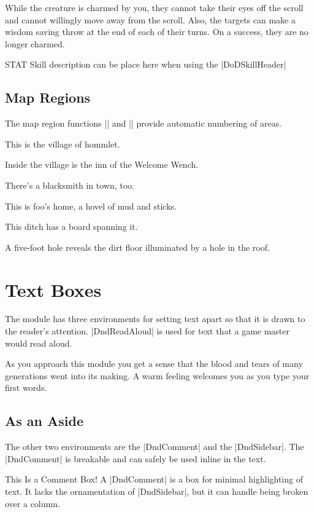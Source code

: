 \documentclass[letterpaper,twocolumn,openany,nodeprecatedcode]{dndbook}
\begin{document}
While the creature is charmed by you, they cannot take their eyes off the scroll and cannot willingly move away from the scroll. Also, the targets can make a wisdom saving throw at the end of each of their turns. On a success, they are no longer charmed.

 {STAT}
Skill description can be place here when using the |DoDSkillHeader|

\section{Map Regions}
The map region functions |\DndArea| and |\DndSubArea| provide automatic numbering of areas.

This is the village of hommlet.

Inside the village is the inn of the Welcome Wench.

There's a blacksmith in town, too.

This is foo's home, a hovel of mud and sticks.

This ditch has a board spanning it.

A five-foot hole reveals the dirt floor illuminated by a hole in the roof.

\chapter{Text Boxes}

The module has three environments for setting text apart so that it is drawn to the reader's attention. |DndReadAloud| is used for text that a game master would read aloud.

\begin{DndReadAloud}
  As you approach this module you get a sense that the blood and tears of many generations went into its making. A warm feeling welcomes you as you type your first words.
\end{DndReadAloud}

\section{As an Aside}
The other two environments are the |DndComment| and the |DndSidebar|. The |DndComment| is breakable and can safely be used inline in the text.

\begin{DndComment}{This Is a Comment Box!}
  A |DndComment| is a box for minimal highlighting of text. It lacks the ornamentation of |DndSidebar|, but it can handle being broken over a column.
\end{DndComment}
\end{document}
